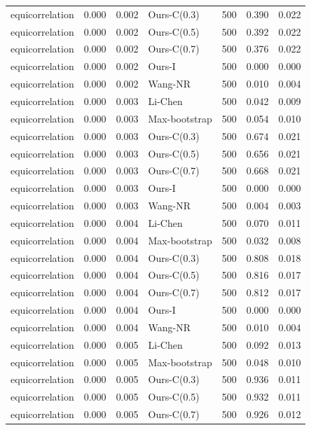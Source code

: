 \begin{tabular}{lrrlrrr}
equicorrelation & 0.000 & 0.002 & Ours-C(0.3) & 500 & 0.390 & 0.022 \\
equicorrelation & 0.000 & 0.002 & Ours-C(0.5) & 500 & 0.392 & 0.022 \\
equicorrelation & 0.000 & 0.002 & Ours-C(0.7) & 500 & 0.376 & 0.022 \\
equicorrelation & 0.000 & 0.002 & Ours-I & 500 & 0.000 & 0.000 \\
equicorrelation & 0.000 & 0.002 & Wang-NR & 500 & 0.010 & 0.004 \\
equicorrelation & 0.000 & 0.003 & Li-Chen & 500 & 0.042 & 0.009 \\
equicorrelation & 0.000 & 0.003 & Max-bootstrap & 500 & 0.054 & 0.010 \\
equicorrelation & 0.000 & 0.003 & Ours-C(0.3) & 500 & 0.674 & 0.021 \\
equicorrelation & 0.000 & 0.003 & Ours-C(0.5) & 500 & 0.656 & 0.021 \\
equicorrelation & 0.000 & 0.003 & Ours-C(0.7) & 500 & 0.668 & 0.021 \\
equicorrelation & 0.000 & 0.003 & Ours-I & 500 & 0.000 & 0.000 \\
equicorrelation & 0.000 & 0.003 & Wang-NR & 500 & 0.004 & 0.003 \\
equicorrelation & 0.000 & 0.004 & Li-Chen & 500 & 0.070 & 0.011 \\
equicorrelation & 0.000 & 0.004 & Max-bootstrap & 500 & 0.032 & 0.008 \\
equicorrelation & 0.000 & 0.004 & Ours-C(0.3) & 500 & 0.808 & 0.018 \\
equicorrelation & 0.000 & 0.004 & Ours-C(0.5) & 500 & 0.816 & 0.017 \\
equicorrelation & 0.000 & 0.004 & Ours-C(0.7) & 500 & 0.812 & 0.017 \\
equicorrelation & 0.000 & 0.004 & Ours-I & 500 & 0.000 & 0.000 \\
equicorrelation & 0.000 & 0.004 & Wang-NR & 500 & 0.010 & 0.004 \\
equicorrelation & 0.000 & 0.005 & Li-Chen & 500 & 0.092 & 0.013 \\
equicorrelation & 0.000 & 0.005 & Max-bootstrap & 500 & 0.048 & 0.010 \\
equicorrelation & 0.000 & 0.005 & Ours-C(0.3) & 500 & 0.936 & 0.011 \\
equicorrelation & 0.000 & 0.005 & Ours-C(0.5) & 500 & 0.932 & 0.011 \\
equicorrelation & 0.000 & 0.005 & Ours-C(0.7) & 500 & 0.926 & 0.012 \\

\end{tabular}

